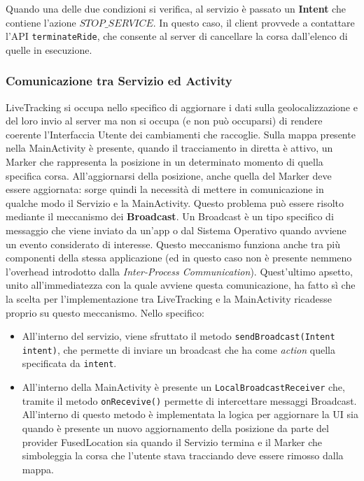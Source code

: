                             Quando una delle due condizioni si verifica, al servizio è passato un \textbf{Intent} che contiene l'azione \texttt{$STOP\_SERVICE$}. In questo caso, il client provvede a contattare l'API \texttt{terminateRide}, che consente al server di cancellare la corsa dall'elenco di quelle in esecuzione.
                        
                            \subsubsection{Comunicazione tra Servizio ed Activity}
                                LiveTracking si occupa nello specifico di aggiornare i dati sulla geolocalizzazione e del loro invio al server ma non si occupa (e non può occuparsi) di rendere coerente l'Interfaccia Utente dei cambiamenti che raccoglie. Sulla mappa presente nella MainActivity è presente, quando il tracciamento in diretta è attivo, un Marker che rappresenta la posizione in un determinato momento di quella specifica corsa. All'aggiornarsi della posizione, anche quella del Marker deve essere aggiornata: sorge quindi la necessità di mettere in comunicazione in qualche modo il Servizio e la MainActivity. Questo problema può essere risolto mediante il meccanismo dei \textbf{Broadcast}. Un Broadcast è un tipo specifico di messaggio che viene inviato da un'app o dal Sistema Operativo quando avviene un evento considerato di interesse. Questo meccanismo funziona anche tra più componenti della stessa applicazione (ed in questo caso non è presente nemmeno l'overhead introdotto dalla \textit{Inter-Process Communication}). Quest'ultimo apsetto, unito all'immediatezza con la quale avviene questa comunicazione, ha fatto sì che la scelta per l'implementazione tra LiveTracking e la MainActivity ricadesse proprio su questo meccanismo. Nello specifico: 
                                \begin{itemize}
                                    \item All'interno del servizio, viene sfruttato il metodo \texttt{sendBroadcast(Intent intent)}, che permette di inviare un broadcast che ha come \textit{action} quella specificata da \texttt{intent}.
                                    \item All'interno della MainActivity è presente un \texttt{LocalBroadcastReceiver} che, tramite il metodo \texttt{onRecevive()} permette di intercettare messaggi Broadcast. All'interno di questo metodo è implementata la logica per aggiornare la UI sia quando è presente un nuovo aggiornamento della posizione da parte del provider FusedLocation sia quando il Servizio termina e il Marker che simboleggia la corsa che l'utente stava tracciando deve essere rimosso dalla mappa.
                                \end{itemize}

